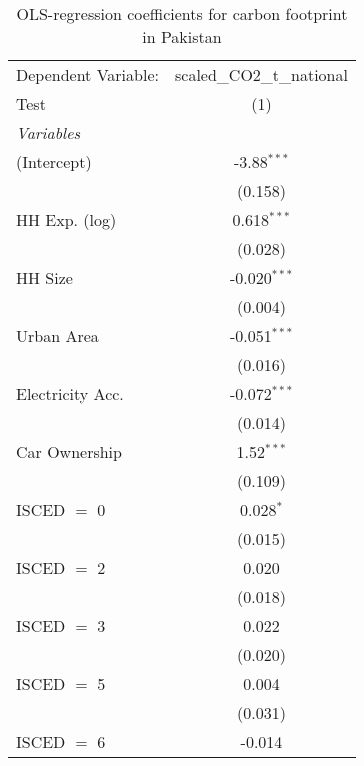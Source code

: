 
\begin{table}[htbp!]
   \centering
   \small
   \begin{adjustbox}{width = 1\textwidth, max height = 0.95\textheight, center}
      \begin{threeparttable}[b]
         \caption{\label{tab:OLS_2_PAK} OLS-regression coefficients for carbon footprint in Pakistan}
         \begin{tabular}{lc}
            \tabularnewline \midrule \midrule
            Dependent Variable: & scaled\_CO2\_t\_national\\     
            Test                & (1)\\  
            \midrule
            \emph{Variables}\\
            (Intercept)         & -3.88$^{***}$\\   
                                & (0.158)\\   
            HH Exp. (log)       & 0.618$^{***}$\\   
                                & (0.028)\\   
            HH Size             & -0.020$^{***}$\\   
                                & (0.004)\\   
            Urban Area          & -0.051$^{***}$\\   
                                & (0.016)\\   
            Electricity Acc.    & -0.072$^{***}$\\   
                                & (0.014)\\   
            Car Ownership       & 1.52$^{***}$\\   
                                & (0.109)\\   
            ISCED $=$ 0         & 0.028$^{*}$\\   
                                & (0.015)\\   
            ISCED $=$ 2         & 0.020\\   
                                & (0.018)\\   
            ISCED $=$ 3         & 0.022\\   
                                & (0.020)\\   
            ISCED $=$ 5         & 0.004\\   
                                & (0.031)\\   
            ISCED $=$ 6         & -0.014\\   

\end{tabular}
\end{threeparttable}
\end{adjustbox}
\end{table}

